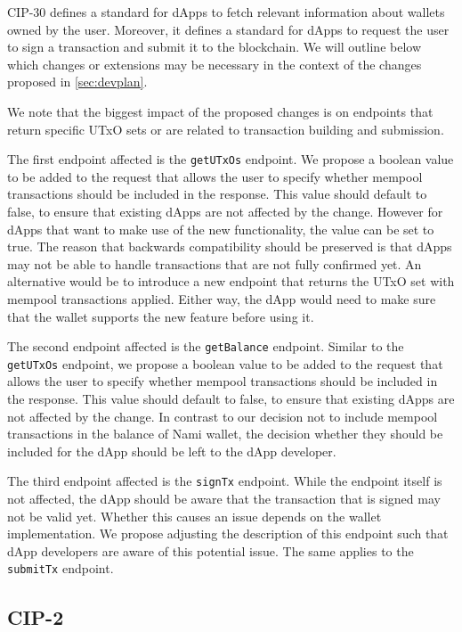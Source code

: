 \documentclass[11pt]{article}
\begin{document}
CIP-30 \cite{cip30} defines a standard for dApps to fetch relevant information about wallets owned by the user.
Moreover, it defines a standard for dApps to request the user to sign a transaction and submit it to the blockchain.
We will outline below which changes or extensions may be necessary in the context of the changes proposed in \cref{sec:devplan}.

We note that the biggest impact of the proposed changes is on endpoints that return specific UTxO sets 
or are related to transaction building and submission.

The first endpoint affected is the \texttt{getUTxOs} endpoint.
We propose a boolean value to be added to the request that allows the user to specify whether mempool transactions should be included in the response.
This value should default to false, to ensure that existing dApps are not affected by the change.
However for dApps that want to make use of the new functionality, the value can be set to true.
The reason that backwards compatibility should be preserved is that dApps may not be able to handle transactions that are not fully confirmed yet.
An alternative would be to introduce a new endpoint that returns the UTxO set with mempool transactions applied.
Either way, the dApp would need to make sure that the wallet supports the new feature before using it.

The second endpoint affected is the \texttt{getBalance} endpoint.
Similar to the \texttt{getUTxOs} endpoint, we propose a boolean value to be added to the request that allows the user to specify whether mempool transactions should be included in the response.
This value should default to false, to ensure that existing dApps are not affected by the change.
In contrast to our decision not to include mempool transactions in the balance of Nami wallet, the decision whether they should be included for the dApp
should be left to the dApp developer.

The third endpoint affected is the \texttt{signTx} endpoint.
While the endpoint itself is not affected, the dApp should be aware that the transaction that is signed may not be valid yet.
Whether this causes an issue depends on the wallet implementation.
We propose adjusting the description of this endpoint such that dApp developers are aware of this potential issue.
The same applies to the \texttt{submitTx} endpoint.

\subsection{CIP-2}
\end{document}
